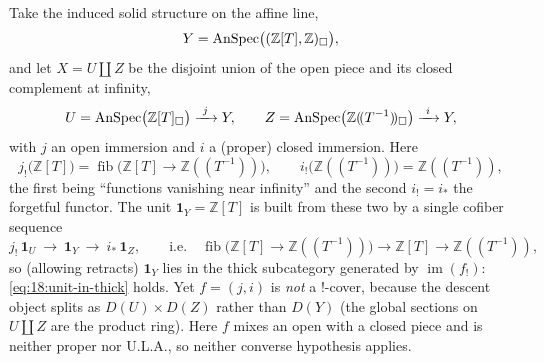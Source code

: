 \begin{example}
\label{ex:18:converse-fails}
Take the induced solid structure on the affine line,
\begin{equation*}
Y=\operatorname{AnSpec}\bigl((\mathbb{Z}[T],\mathbb{Z})_\square\bigr),
\end{equation*}
and let $X=U\amalg Z$ be the disjoint union of the open piece and its closed
complement at infinity,
\begin{equation*}
U=\AnSpec\bigl(\mathbb{Z}[T]_\solid\bigr)\xrightarrow{\ j\ }Y,\qquad
Z=\AnSpec\bigl(\mathbb{Z}(\!(T^{-1})\!)_\solid\bigr)\xrightarrow{\ i\ }Y,
\end{equation*}
with $j$ an open immersion and $i$ a (proper) closed immersion. Here
\begin{equation*}
j_!\bigl(\mathbb{Z}[T]\bigr)=\operatorname{fib}\bigl(\mathbb{Z}[T]\to\mathbb{Z}(\!(T^{-1})\!)\bigr),
\qquad
i_!\bigl(\mathbb{Z}(\!(T^{-1})\!)\bigr)=\mathbb{Z}(\!(T^{-1})\!),
\end{equation*}
the first being ``functions vanishing near infinity'' and the second $i_!=i_*$ the
forgetful functor. The unit $\mathbf 1_Y=\mathbb{Z}[T]$ is built from these two by
a single cofiber sequence
\begin{equation*}
j_!\,\mathbf 1_U\ \longrightarrow\ \mathbf 1_Y\ \longrightarrow\ i_*\,\mathbf 1_Z,
\qquad\text{i.e.}\quad
\operatorname{fib}\bigl(\mathbb{Z}[T]\to\mathbb{Z}(\!(T^{-1})\!)\bigr)\to \mathbb{Z}[T]\to\mathbb{Z}(\!(T^{-1})\!),
\end{equation*}
so (allowing retracts) $\mathbf 1_Y$ lies in the thick subcategory generated by
$\operatorname{im}(f_!)$: \eqref{eq:18:unit-in-thick} holds. Yet $f=(j,i)$ is
\emph{not} a $!$-cover, because the descent object splits as $D(U)\times D(Z)$
rather than $D(Y)$ (the global sections on $U\amalg Z$ are the product ring). Here
$f$ mixes an open with a closed piece and is neither proper nor U.L.A., so neither
converse hypothesis applies.
\end{example}

